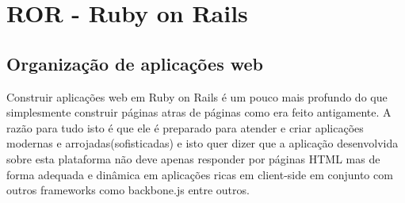 \chapter{ROR - Ruby on Rails}
\thispagestyle{empty}

\section{Organização de aplicações web}
Construir aplicações web em Ruby on Rails é um pouco mais profundo do que simplesmente construir páginas atras de páginas como era feito antigamente.
A razão para tudo isto é que ele é preparado para atender e criar aplicações modernas e arrojadas(sofisticadas) e isto quer dizer que a aplicação desenvolvida
sobre esta plataforma não deve apenas responder por páginas HTML mas de forma adequada e dinâmica em aplicações ricas em client-side em conjunto com outros 
frameworks como backbone.js entre outros.
